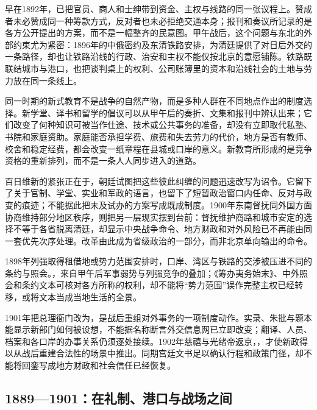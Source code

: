早在1892年，已把官员、商人和士绅带到资金、主权与线路的同一张议程上。赞成者未必赞成同一种筹款方式，反对者也未必拒绝交通本身；报刊和奏议所记录的是各方公开提出的方案，而不是一幅整齐的民意图。甲午战后，这个问题与东北的外部约束尤为紧密：1896年的中俄密约及东清铁路安排，为清廷提供了对日后外交的一条路径，却也让铁路沿线的行政、治安和主权不能仅按北京的意愿铺陈。铁路既联结城市与港口，也把谈判桌上的权利、公司账簿里的资本和沿线社会的土地与劳力放在同一条线上。


同一时期的新式教育不是战争的自然产物，而是多种人群在不同地点作出的制度选择。新学堂、译书和留学的倡议可以从甲午后的奏折、文集和报刊中辨认出来；它们改变了何种知识可被当作仕途、技术或公共事务的准备，却没有立即取代私塾、书院和家庭资助。家庭能否承担学费、旅费和失去劳力的代价，地方是否有教师、校舍和稳定经费，都会改变一纸章程在县城或口岸的意义。新教育所形成的是竞争资格的重新排列，而不是一条人人同步进入的道路。

百日维新的紧张正在于，朝廷试图把这些彼此纠缠的问题迅速改写为诏令。它留下了关于官制、学堂、实业和军政的语言，也留下了短暂政治窗口内任命、反对与政变的痕迹；不能据此把未及试办的方案写成既成制度。1900年东南督抚同外国方面协商维持部分地区秩序，则把另一层现实摆到台前：督抚维护商路和城市安定的选择不等于各省脱离清廷，却显示中央战争命令、地方财政和对外风险已不再能由同一套优先次序处理。改革由此成为省级政治的一部分，而非北京单向输出的命令。

1898年列强取得租借地或势力范围安排时，口岸、湾区与铁路的交涉被压进不同的条约与照会。，来自甲午后军事弱势与列强竞争的叠加；《筹办夷务始末》、中外照会和条约文本可核对各方所称的权利，却不能将“势力范围”误作完整主权已经转移，或将文本当成当地生活的全景。




1901年把总理衙门改为，是战后重组对外事务的一项制度动作。实录、朱批与题本能显示新部门如何被设想，不能据名称断言外交信息网已立即改变；翻译、人员、档案和各口岸的办事关系仍须逐处接续。1902年慈禧与光绪帝返京，，才使新政得以从战后重建合法性的场景中推出。同期宫廷文书足以确认行程和政策门径，却不能将回銮写成地方财政和社会信任已经恢复。



\subsection{1889—1901：在礼制、港口与战场之间}





























